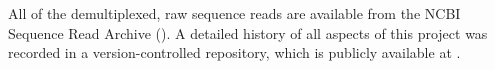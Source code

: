 All of the demultiplexed, raw sequence reads are available from the NCBI
Sequence Read Archive
().
A detailed history of all aspects of this project was recorded in a
version-controlled repository, which is publicly available at
.
